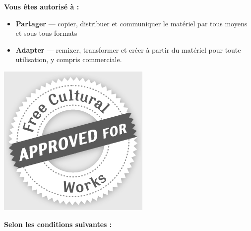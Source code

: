 \documentclass[12pt]{book}
\begin{document}
\begin{tcolorbox}[colback=my-grey,
	colframe=my-grey,  
	center, arc=0pt,outer arc=0pt,
	valign=top, 
	halign=left,
	width=\textwidth]
	
	
	
	\begin{center}
		\bfseries\Large
		Vous êtes autorisé à :
	\end{center}
	
	\begin{minipage}{0.83\textwidth}
		\begin{itemize}
			\item[] \textbf{Partager} — copier, distribuer et communiquer le matériel par tous moyens et sous tous formats
			\item[] \textbf{Adapter} — remixer, transformer et créer à partir du matériel
			pour toute utilisation, y compris commerciale.
		\end{itemize}
	\end{minipage}
	\begin{minipage}{0.15\textwidth}
		\includegraphics[width=\textwidth]{../img/licence/FreeCulturalWorks_seal_x2.jpg}
	\end{minipage}
	
	
	\begin{center}
		\bfseries\Large
		Selon les conditions suivantes :
	\end{center}
	

\end{tcolorbox}
\end{document}
